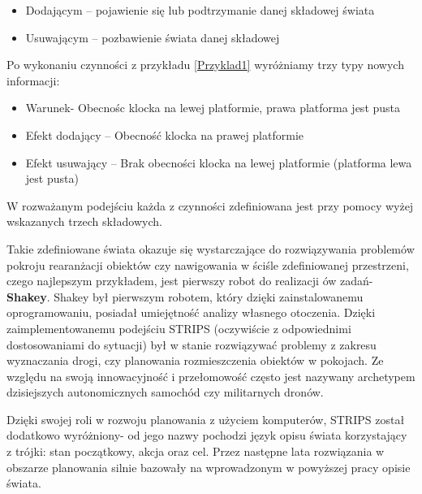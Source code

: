     \begin{itemize}
        \item Dodającym -- pojawienie się lub podtrzymanie danej składowej świata
        \item Usuwającym -- pozbawienie świata danej składowej
    \end{itemize}
    Po wykonaniu czynności z przykładu \ref{Przyklad1} wyróżniamy trzy typy nowych informacji:
    \begin{itemize}
        \item Warunek- Obecnośc klocka na lewej platformie, prawa platforma jest pusta
        \item Efekt dodający -- Obecność klocka na prawej platformie
        \item Efekt usuwający -- Brak obecności klocka na lewej platformie (platforma lewa jest pusta)
    \end{itemize}
    W rozważanym podejściu każda z czynności zdefiniowana jest przy pomocy wyżej wskazanych trzech składowych.

        Takie zdefiniowane świata okazuje się wystarczające do rozwiązywania problemów pokroju rearanżacji obiektów czy 
    nawigowania w ściśle zdefiniowanej przestrzeni, czego najlepszym przykładem, jest pierwszy robot do realizacji ów zadań- \textbf{Shakey}.
    Shakey był pierwszym robotem, który dzięki zainstalowanemu oprogramowaniu,
    posiadał umiejętność analizy własnego otoczenia. Dzięki zaimplementowanemu podejściu 
    STRIPS (oczywiście z odpowiednimi dostosowaniami do sytuacji) był w stanie rozwiązywać problemy z zakresu wyznaczania drogi,
    czy planowania rozmieszczenia obiektów w pokojach.
    Ze względu na swoją innowacyjność i przełomowość często jest nazywany archetypem
    dzisiejszych autonomicznych samochód czy militarnych dronów.

    Dzięki swojej roli w rozwoju planowania z użyciem komputerów, STRIPS został dodatkowo wyróżniony- od jego nazwy pochodzi język opisu świata korzystający
    z trójki: stan początkowy, akcja oraz cel. Przez następne lata rozwiązania w obszarze planowania silnie bazowały na wprowadzonym w powyższej pracy opisie świata.

